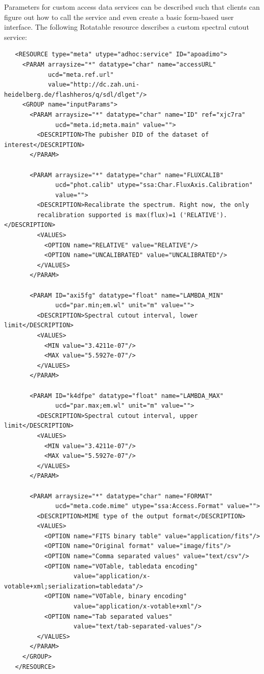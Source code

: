 \documentclass[11pt,a4paper]{ivoa}
\begin{document}
Parameters for custom access data services can be described such that
clients can figure out how to call the service and even create a basic
form-based user interface. The following Rotatable resource describes
a custom spectral cutout service:
\begin{verbatim}
   <RESOURCE type="meta" utype="adhoc:service" ID="apoadimo">
     <PARAM arraysize="*" datatype="char" name="accessURL"
            ucd="meta.ref.url"
            value="http://dc.zah.uni-heidelberg.de/flashheros/q/sdl/dlget"/>
     <GROUP name="inputParams">
       <PARAM arraysize="*" datatype="char" name="ID" ref="xjc7ra"
              ucd="meta.id;meta.main" value="">
         <DESCRIPTION>The pubisher DID of the dataset of interest</DESCRIPTION>
       </PARAM>

       <PARAM arraysize="*" datatype="char" name="FLUXCALIB"
              ucd="phot.calib" utype="ssa:Char.FluxAxis.Calibration"
              value="">
         <DESCRIPTION>Recalibrate the spectrum. Right now, the only
         recalibration supported is max(flux)=1 ('RELATIVE').</DESCRIPTION>
         <VALUES>
           <OPTION name="RELATIVE" value="RELATIVE"/>
           <OPTION name="UNCALIBRATED" value="UNCALIBRATED"/>
         </VALUES>
       </PARAM>

       <PARAM ID="axi5fg" datatype="float" name="LAMBDA_MIN"
              ucd="par.min;em.wl" unit="m" value="">
         <DESCRIPTION>Spectral cutout interval, lower limit</DESCRIPTION>
         <VALUES>
           <MIN value="3.4211e-07"/>
           <MAX value="5.5927e-07"/>
         </VALUES>
       </PARAM>

       <PARAM ID="k4dfpe" datatype="float" name="LAMBDA_MAX"
              ucd="par.max;em.wl" unit="m" value="">
         <DESCRIPTION>Spectral cutout interval, upper limit</DESCRIPTION>
         <VALUES>
           <MIN value="3.4211e-07"/>
           <MAX value="5.5927e-07"/>
         </VALUES>
       </PARAM>

       <PARAM arraysize="*" datatype="char" name="FORMAT"
              ucd="meta.code.mime" utype="ssa:Access.Format" value="">
         <DESCRIPTION>MIME type of the output format</DESCRIPTION>
         <VALUES>
           <OPTION name="FITS binary table" value="application/fits"/>
           <OPTION name="Original format" value="image/fits"/>
           <OPTION name="Comma separated values" value="text/csv"/>
           <OPTION name="VOTable, tabledata encoding"
                   value="application/x-votable+xml;serialization=tabledata"/>
           <OPTION name="VOTable, binary encoding"
                   value="application/x-votable+xml"/>
           <OPTION name="Tab separated values"
                   value="text/tab-separated-values"/>
         </VALUES>
       </PARAM>
     </GROUP>
   </RESOURCE>
\end{verbatim}
\end{document}
